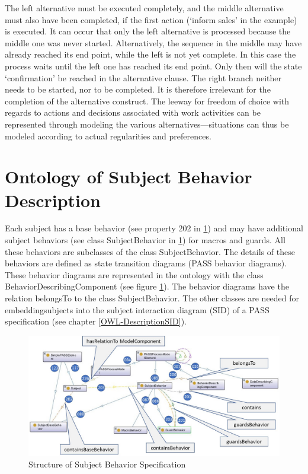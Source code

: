 The left alternative must be executed completely, and the middle alternative must also have been completed, if the first action (‘inform sales’ in the example) is executed. It can occur that only the left alternative is processed because the middle one was never started. Alternatively, the sequence in the middle may have already reached its end point, while the left is not yet complete. In this case the process waits until the left one has reached its end point. Only then will the state ‘confirmation’ be reached in the alternative clause. The right branch neither needs to be started, nor to be completed. It is therefore irrelevant for the completion of the alternative construct.
The leeway for freedom of choice with regards to actions and decisions associated with work activities can be represented through modeling the various alternatives—situations can thus be modeled according to actual regularities and preferences.


\newpage

\section{Ontology of Subject Behavior Description}
Each subject has a base behavior (see property 202 in \ref{fig:20190104-simple-elements-and-modellelement}) and may have additional subject behaviors (see class SubjectBehavior in \ref{fig:20190104-simple-elements-and-modellelement}) for macros and guards. All these behaviors are subclasses of the class SubjectBehavior. The details of these behaviors are defined as state transition diagrams (PASS behavior diagrams). These behavior diagrams are represented in the ontology with the class BehaviorDescribingComponent (see figure \ref{fig:20190104-simple-elements-and-modellelement}). The behavior diagrams have the relation belongsTo to the class SubjectBehavior. The other classes are needed for embeddingsubjects into the subject interaction diagram (SID) of a PASS specification (see chapter \ref{OWL-DescriptionSID}).
\begin{figure}[ph]
	\centering
	\includegraphics[width=0.9\linewidth]{20181026-Ontologie-Bilder/Grafiken-Ontologie/SUbjectExecution/20190104-SImple-Elements-and-Modellelement}
	\caption[Structure of Subject Behavior Specification]{Structure of Subject Behavior Specification}
	\label{fig:20190104-simple-elements-and-modellelement}
\end{figure}

